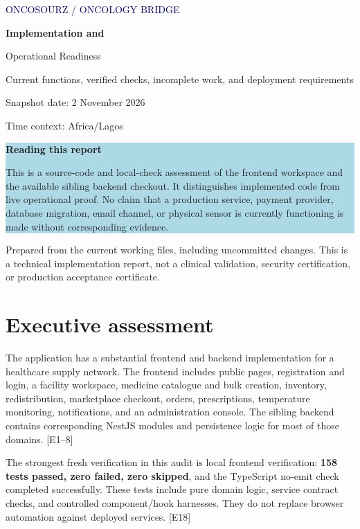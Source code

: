 \documentclass[11pt,a4paper]{article}
\newcommand{\evidence}[1]{\textcolor{muted}{[E#1]}}
\begin{document}
\begin{titlepage}
\vspace*{18mm}
{\large\textcolor{navy}{ONCOSOURZ / ONCOLOGY BRIDGE}\par}
\vspace{14mm}
{\Huge\bfseries Implementation and\par Operational Readiness\par}
\vspace{8mm}
{\Large Current functions, verified checks, incomplete work, and deployment requirements\par}
\vspace{12mm}
{\large Snapshot date: 2 November 2026\par}
{\large Time context: Africa/Lagos\par}
\vfill
\colorbox{lightblue}{\parbox{0.92\textwidth}{\vspace{4mm}\textbf{Reading this report}\par
This is a source-code and local-check assessment of the frontend workspace and the available sibling backend checkout. It distinguishes implemented code from live operational proof. No claim that a production service, payment provider, database migration, email channel, or physical sensor is currently functioning is made without corresponding evidence.\vspace{4mm}}}
\vspace{10mm}
\textcolor{muted}{Prepared from the current working files, including uncommitted changes. This is a technical implementation report, not a clinical validation, security certification, or production acceptance certificate.}
\end{titlepage}
\tableofcontents
\newpage

\section{Executive assessment}
The application has a substantial frontend and backend implementation for a healthcare supply network. The frontend includes public pages, registration and login, a facility workspace, medicine catalogue and bulk creation, inventory, redistribution, marketplace checkout, orders, prescriptions, temperature monitoring, notifications, and an administration console. The sibling backend contains corresponding NestJS modules and persistence logic for most of those domains. \evidence{1--8}

The strongest fresh verification in this audit is local frontend verification: \textbf{158 tests passed, zero failed, zero skipped}, and the TypeScript no-emit check completed successfully. These tests include pure domain logic, service contract checks, and controlled component/hook harnesses. They do not replace browser automation against deployed services. \evidence{18}
\end{document}
